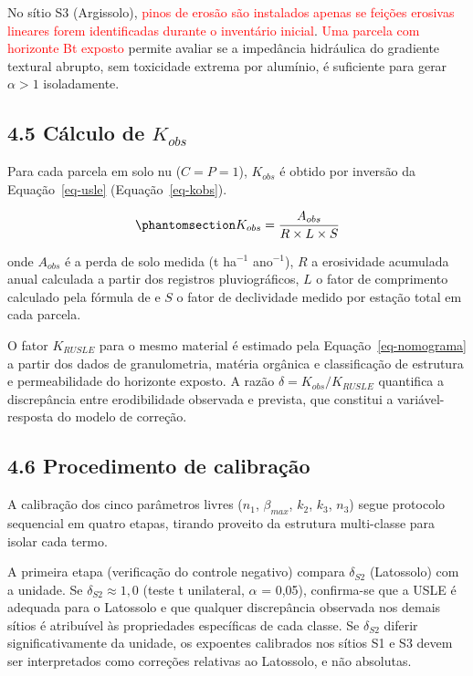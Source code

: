 \documentclass[
  brazilian,
  authoryear,
  preprint]{elsarticle}
\begin{document}
No sítio S3 (Argissolo), \textcolor{red}{pinos de erosão são instalados
apenas se feições erosivas lineares forem identificadas durante o
inventário inicial}. \textcolor{red}{Uma parcela com horizonte Bt
exposto} permite avaliar se a impedância hidráulica do gradiente
textural abrupto, sem toxicidade extrema por alumínio, é suficiente para
gerar \(\alpha > 1\) isoladamente.

\subsection{\texorpdfstring{4.5 Cálculo de
\(K_{obs}\)}{4.5 Cálculo de K\_\{obs\}}}\label{cuxe1lculo-de-k_obs}

Para cada parcela em solo nu (\(C = P = 1\)), \(K_{obs}\) é obtido por
inversão da Equação~\ref{eq-usle} (Equação~\ref{eq-kobs}).

\begin{equation}\phantomsection\label{eq-kobs}{
K_{obs} = \dfrac{A_{obs}}{R \times L \times S}
}\end{equation}

onde \(A_{obs}\) é a perda de solo medida (t ha\(^{-1}\) ano\(^{-1}\)),
\(R\) a erosividade acumulada anual calculada a partir dos registros
pluviográficos, \(L\) o fator de comprimento calculado pela fórmula de
\citet{renard_et_al_1997} e \(S\) o fator de declividade medido por
estação total em cada parcela.

O fator \(K_{RUSLE}\) para o mesmo material é estimado pela
Equação~\ref{eq-nomograma} a partir dos dados de granulometria, matéria
orgânica e classificação de estrutura e permeabilidade do horizonte
exposto. A razão \(\delta = K_{obs}/K_{RUSLE}\) quantifica a
discrepância entre erodibilidade observada e prevista, que constitui a
variável-resposta do modelo de correção.

\subsection{4.6 Procedimento de
calibração}\label{procedimento-de-calibrauxe7uxe3o}

A calibração dos cinco parâmetros livres (\(n_1\), \(\beta_{max}\),
\(k_2\), \(k_3\), \(n_3\)) segue protocolo sequencial em quatro etapas,
tirando proveito da estrutura multi-classe para isolar cada termo.

A primeira etapa (verificação do controle negativo) compara
\(\delta_{S2}\) (Latossolo) com a unidade. Se
\(\delta_{S2} \approx 1{,}0\) (teste t unilateral, \(\alpha\) = 0,05),
confirma-se que a USLE é adequada para o Latossolo e que qualquer
discrepância observada nos demais sítios é atribuível às propriedades
específicas de cada classe. Se \(\delta_{S2}\) diferir
significativamente da unidade, os expoentes calibrados nos sítios S1 e
S3 devem ser interpretados como correções relativas ao Latossolo, e não
absolutas.
\end{document}
